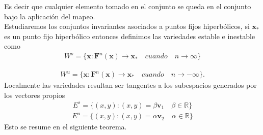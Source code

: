 Es decir que cualquier elemento tomado en el conjunto se queda en el conjunto bajo la aplicación del mapeo. \\
Estudiaremos los conjuntos invariantes asociados a puntos fijos hiperbólicos, si $\pmb x_{*}$ es un punto fijo hiperbólico entonces definimos las variedades estable e inestable como
\begin{eqnarray}
W^{s}=\lbrace \pmb x : \pmb F^{n}(\pmb x)\rightarrow \pmb x_{*} \quad cuando \quad n\rightarrow \infty \rbrace
\label{variedad estable}
\end{eqnarray}

\begin{eqnarray}
W^{u}=\lbrace \pmb x : \pmb F^{n}(\pmb x)\rightarrow \pmb x_{*} \quad cuando \quad n\rightarrow -\infty \rbrace.
\label{variedad inestable}
\end{eqnarray}
Localmente las variedades resultan ser tangentes a los subespacios generados por los vectores propios
\begin{eqnarray*}
E^{s}=\lbrace (x,y) : (x,y)=\beta \pmb v_{1} \quad \beta\in \mathbb{R}\rbrace
\end{eqnarray*}
\begin{eqnarray*}
E^{u}=\lbrace (x,y) : (x,y)=\alpha \pmb v_{2}\quad \alpha\in \mathbb{R}\rbrace
\end{eqnarray*}
Esto se resume en el siguiente teorema.


